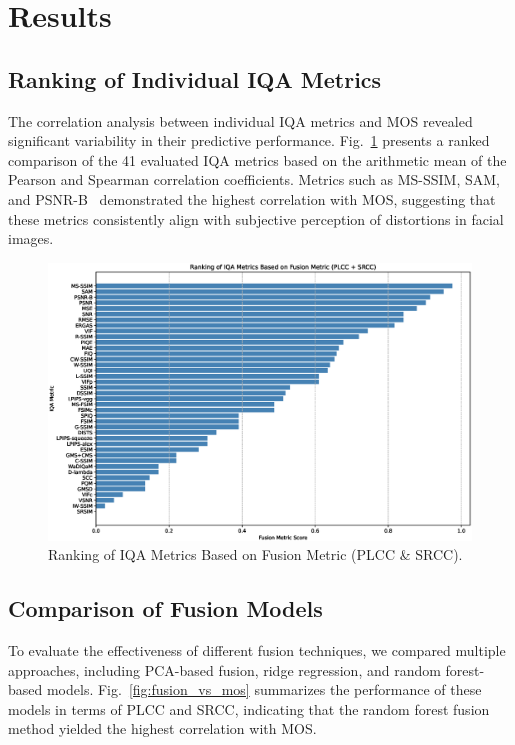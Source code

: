 \section{Results}

\subsection{Ranking of Individual IQA Metrics}

The correlation analysis between individual IQA metrics and MOS revealed significant variability in their predictive performance. Fig.~\ref{fig:ranking} presents a ranked comparison of the 41 evaluated IQA metrics based on the arithmetic mean of the Pearson and Spearman correlation coefficients. Metrics such as MS-SSIM, SAM, and PSNR-B~\cite{ma2011psnr} demonstrated the highest correlation with MOS, suggesting that these metrics consistently align with subjective perception of distortions in facial images.

\begin{figure}[htbp]
    \centering
    \includegraphics[width=\linewidth]{images/fusion_metric_ranking.eps}
    \caption{Ranking of IQA Metrics Based on Fusion Metric (PLCC \& SRCC).}\label{fig:ranking}
\end{figure}

\subsection{Comparison of Fusion Models}

To evaluate the effectiveness of different fusion techniques, we compared multiple approaches, including PCA-based fusion, ridge regression, and random forest-based models. Fig.~\ref{fig:fusion_vs_mos} summarizes the performance of these models in terms of PLCC and SRCC, indicating that the random forest fusion method yielded the highest correlation with MOS.\@

